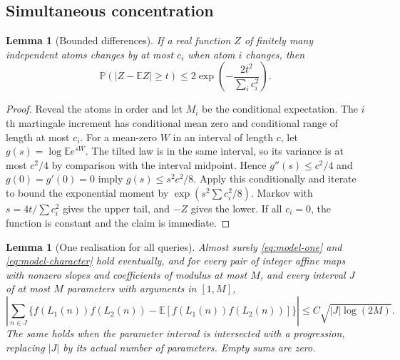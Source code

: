 \documentclass[11pt]{article}
\newtheorem{lemma}[theorem]{Lemma}
\theoremstyle{definition}
\newcommand{\E}{\mathbb E}
\newcommand{\Prob}{\mathbb P}
\theoremstyle{remark}
\numberwithin{equation}{section}
\begin{document}
\subsection{Simultaneous concentration}
\begin{lemma}[Bounded differences]\label{lem:bounded-differences}
If a real function $Z$ of finitely many independent atoms changes by at most $c_i$ when atom $i$ changes,
then
\begin{equation}\label{eq:bounded-differences}
 \Prob(|Z-\E Z|\ge t)\le2\exp\left(-\frac{2t^2}{\sum_i c_i^2}\right).
\end{equation}
\end{lemma}
\begin{proof}
Reveal the atoms in order and let $M_i$ be the conditional expectation. The $i$th martingale increment
has conditional mean zero and conditional range of length at most $c_i$.
For a mean-zero $W$ in an interval of length $c$, let $g(s)=\log\E e^{sW}$.
The tilted law is in the same interval, so its variance is at most $c^2/4$ by comparison with the interval
midpoint. Hence $g''(s)\le c^2/4$ and $g(0)=g'(0)=0$ imply $g(s)\le s^2c^2/8$.
Apply this conditionally and iterate to bound the exponential moment by
$\exp(s^2\sum c_i^2/8)$. Markov with $s=4t/\sum c_i^2$ gives the upper tail, and $-Z$ gives the lower.
If all $c_i=0$, the function is constant and the claim is immediate.
\end{proof}
\begin{lemma}[One realisation for all queries]\label{lem:b-concentration}
Almost surely \eqref{eq:model-one} and \eqref{eq:model-character} hold eventually, and for every pair of
integer affine maps with nonzero slopes and coefficients of modulus at most $M$, and every interval
$J$ of at most $M$ parameters with arguments in $[1,M]$,
\begin{equation}\label{eq:b-centred-affine}
 \left|\sum_{n\in J}\{f(L_1(n))f(L_2(n))-\E[f(L_1(n))f(L_2(n))]\}\right|
 \le C\sqrt{|J|\log(2M)}.
\end{equation}
The same holds when the parameter interval is intersected with a progression, replacing $|J|$ by its
actual number of parameters. Empty sums are zero.
\end{lemma}
\end{document}
